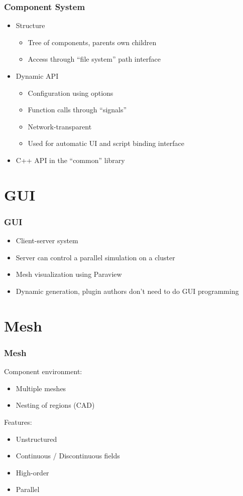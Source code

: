 \documentclass{beamer}
\begin{document}
\begin{frame}
 \frametitle{Component System}
\begin{itemize}
 \item Structure
 \begin{itemize}
  \item Tree of components, parents own children
  \item Access through ``file system'' path interface
 \end{itemize}
 \item Dynamic API
 \begin{itemize}
  \item Configuration using options
  \item Function calls through ``signals''
  \item Network-transparent
  \item Used for automatic UI and script binding interface
 \end{itemize}
 \item C++ API in the ``common'' library
\end{itemize}
\end{frame}

\section{GUI}

\begin{frame}
 \frametitle{GUI}
 \begin{itemize}
  \item Client-server system
  \item Server can control a parallel simulation on a cluster
  \item Mesh visualization using Paraview
  \item Dynamic generation, plugin authors don't need to do GUI programming
 \end{itemize}
\end{frame}

\section{Mesh}

\begin{frame}
  \frametitle{Mesh}
    \begin{block}{Component environment:}
    \begin{itemize}
      \item Multiple meshes
      \item Nesting of regions (CAD)
    \end{itemize}
    \end{block}
    \begin{block}{Features:}
    \begin{itemize}
      \item Unstructured
      \item Continuous / Discontinuous fields
      \item High-order
      \item Parallel
    \end{itemize}
  \end{block}
\end{frame}
\end{document}
